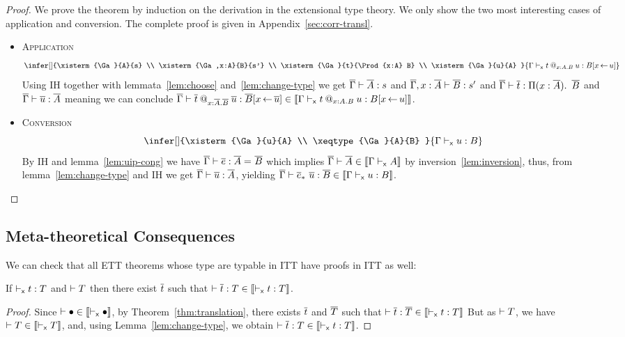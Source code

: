\begin{proof}
  We prove the theorem by induction on the derivation in the
  extensional type theory. We only show the two most interesting cases
  of application and conversion.
  The complete proof is given in Appendix~\ref{sec:corr-transl}.

  \begin{itemize}
    \item \textsc{Application}
    \[
      \infer[]
        {\xisterm{\Ga}{A}{s} \\
         \xisterm{\Ga,x:A}{B}{s'} \\
         \xisterm{\Ga}{t}{\Prod{x:A} B} \\
         \xisterm{\Ga}{u}{A}
        }
        {\xisterm{\Ga}{\app{t}{x:A}{B}{u}}{B[x \sto u]}}
    \]
    Using IH together with lemmata~\ref{lem:choose} and~\ref{lem:change-type}
    we get $\overline{\Gamma} \vdash \overline{A} : s$ and $\overline{\Gamma},x:\overline{A} \vdash \overline{B} : s'$ and
    $\overline{\Gamma} \vdash \overline{t} : \mathop{\Pi(x:\overline{A}).\ } \overline{B}$ and $\overline{\Gamma} \vdash \overline{u} : \overline{A}$
    meaning we can conclude
    $\overline{\Gamma} \vdash \overline{t}\mathbin{@_{x:\overline{A}.\overline{B}}} \overline{u} : \overline{B}[x \mathop{\leftarrow} \overline{u}]
    \in \llbracket \Gamma \vdash_{\mathsf{x}} t\mathbin{@_{x:A.B}} u : B[x \mathop{\leftarrow} u] \rrbracket$.

    \item \textsc{Conversion}
    \[
      \infer[]
        {\xisterm{\Ga}{u}{A} \\
         \xeqtype{\Ga}{A}{B}
        }
        {\xisterm{\Ga}{u}{B}}
    \]
    By IH and lemma~\ref{lem:uip-cong} we have
    $\overline{\Gamma} \vdash \overline{e} : \overline{A} =_{} \overline{B}$ which implies
    $\overline{\Gamma} \vdash \overline{A} \in \llbracket \Gamma \vdash_{\mathsf{x}} A \rrbracket$ by
    inversion~\eqref{lem:inversion}, thus, from lemma~\ref{lem:change-type}
    and IH we get $\overline{\Gamma} \vdash \overline{u} : \overline{A}$, yielding
    $\overline{\Gamma} \vdash \overline{e}_*\ \overline{u} : \overline{B} \in \llbracket \Gamma \vdash_{\mathsf{x}} u : B \rrbracket$.
  \end{itemize}

\end{proof}


\subsection{Meta-theoretical Consequences}
\label{sec:meta-consequences}

We can check that all ETT theorems whose type are typable in ITT have
proofs in ITT as well:

\begin{corollary}
  \label{cor:preservation}
  If $\vdash_{\mathsf{x}} t : T$ and $\vdash T$ then there exist $\overline{t}$ such that
    $\vdash \overline{t} : T \in \llbracket \vdash_{\mathsf{x}} t : T \rrbracket$.
\end{corollary}
\begin{proof}
  Since $\vdash \bullet \in \llbracket \vdash_{\mathsf{x}} \bullet \rrbracket$, by
  Theorem~\eqref{thm:translation}, there exists $\overline{t}$ and $\overline{T}$ such
  that
  $\vdash \overline{t} : \overline{T} \in \llbracket \vdash_{\mathsf{x}} t : T \rrbracket$
  But as $\vdash T$, we have
  $\vdash T \in \llbracket \vdash_{\mathsf{x}} T \rrbracket$, and,
  using Lemma~\ref{lem:change-type}, we obtain
  $\vdash \overline{t} : T \in \llbracket \vdash_{\mathsf{x}} t : T \rrbracket$.
\end{proof}

